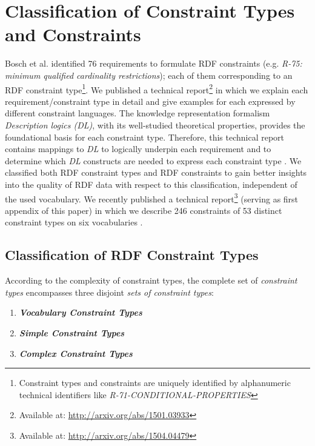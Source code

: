 \documentclass{llncs}
\begin{document}
\section{Classification of Constraint Types and Constraints}
\label{classification}

Bosch et al. identified 76 requirements to formulate RDF constraints (e.g. \emph{R-75: minimum qualified cardinality restrictions}); each of them corresponding to an RDF constraint type\footnote{Constraint types and constraints are uniquely identified by alphanumeric technical identifiers like \emph{R-71-CONDITIONAL-PROPERTIES}}\cite{BoschNolleAcarEckert2015}. 
We published a technical report\footnote{Available at: \url{http://arxiv.org/abs/1501.03933}} in which we explain each requirement/constraint type in detail and give examples for each expressed by different constraint languages.
The knowledge representation formalism \emph{Description logics (DL)}, with its  well-studied theoretical properties, provides the foundational basis for each constraint type.
Therefore, this technical report contains mappings to \emph{DL} to logically underpin each requirement and to determine which \emph{DL} constructs are needed to express each constraint type \cite{BoschNolleAcarEckert2015}.
We classified both RDF constraint types and RDF constraints to gain better insights into the quality of RDF data with respect to this classification, independent of the used vocabulary.
We recently published a technical report\footnote{\label{technical-report-1}Available at: \url{http://arxiv.org/abs/1504.04479}} (serving as first appendix of this paper) in which we describe 246 constraints of 53 distinct constraint types on six vocabularies \cite{BoschZapilkoWackerowEckert2015}.

\subsection{Classification of RDF Constraint Types}

According to the complexity of constraint types, the complete set of \emph{constraint types} encompasses three disjoint \emph{sets of constraint types}:
\begin{enumerate}
	\item \textbf{\emph{Vocabulary Constraint Types}}
	\item \textbf{\emph{Simple Constraint Types}}
	\item \textbf{\emph{Complex Constraint Types}}
\end{enumerate}
\end{document}
